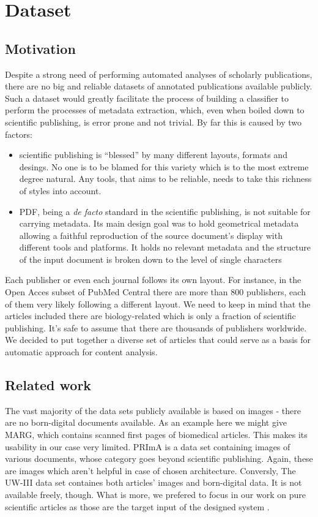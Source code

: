 \chapter{Dataset}
\section{Motivation}
Despite a strong need of performing automated analyses of scholarly publications, there are no big and reliable datasets of annotated publications available publicly. Such a dataset would greatly facilitate the process of building a classifier to perform the processes of metadata extraction, which, even when boiled down to scientific publishing, is error prone and not trivial. By far this is caused by two factors:
\begin{itemize}
\item scientific publishing is ``blessed'' by many different layouts, formats and desings. No one is to be blamed for this variety which is to the most extreme degree natural. Any tools, that aims to be reliable, needs to take this richness of styles into account.
\item PDF, being a \textit{de facto} standard in the scientific publishing, is not suitable for carrying metadata. Its main design goal was to hold geometrical metadata allowing a faithful reproduction of the source document's display with different tools and platforms. It holds no relevant metadata and the structure of the input document is broken down to the level of single characters
\end{itemize}
Each publisher or even each journal follows its own layout. For instance, in the Open Acces subset of PubMed Central there are more than 800 publishers, each of them very likely following a different layout. We need to keep in mind that the articles included there are biology-related which is only a fraction of scientific publishing. It's safe to assume that there are thousands of publishers worldwide. We decided to put together a diverse set of articles that could serve as a basis for automatic approach for content analysis. 
\section{Related work}
The vast majority of the data sets publicly available is based on images - there are no born-digital documents available. As an example here we might give MARG, which contains scanned first pages of biomedical articles. This makes its usability in our case very limited. PRImA is a data set containing images of various documents, whose category goes beyond scientific publishing. Again, these are images which aren't helpful in case of chosen architecture. Conversly, The UW-III data set containes both articles' images and born-digital data. It is not available freely, though. What is more, we prefered to focus in our work on pure scientific articles as those are the target input of the designed system .
